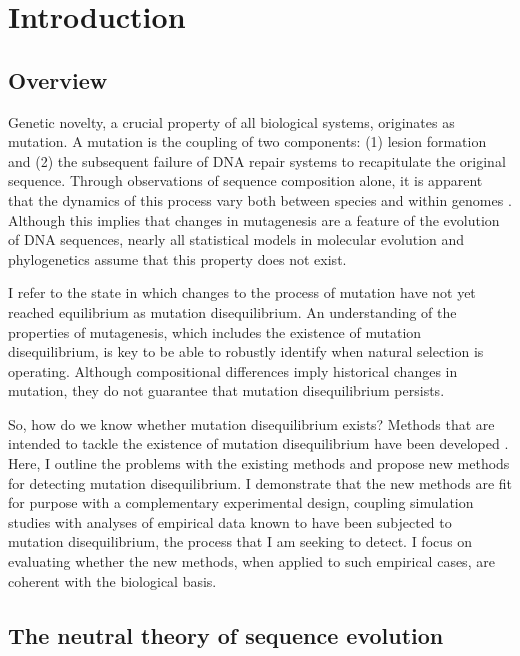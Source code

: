 \chapter{Introduction}

\section{Overview}
Genetic novelty, a crucial property of all biological systems, originates as mutation. A mutation is the coupling of two components: (1) lesion formation and (2) the subsequent failure of DNA repair systems to recapitulate the original sequence. Through observations of sequence composition alone, it is apparent that the dynamics of this process vary both between species \citep{Karlin1994ComparisonsSequences} and within genomes \citep{Francioli2015Genome-wideHumans}. Although this implies that changes in mutagenesis are a feature of the evolution of DNA sequences, nearly all statistical models in molecular evolution and phylogenetics assume that this property does not exist. 

I refer to the state in which changes to the process of mutation have not yet reached \gls{equilibrium} as mutation disequilibrium. An understanding of the properties of mutagenesis, which includes the existence of mutation disequilibrium, is key to be able to robustly identify when natural selection is operating. Although compositional differences imply historical changes in mutation, they do not guarantee that mutation disequilibrium persists. 

So, how do we know whether mutation disequilibrium exists? Methods that are intended to tackle the existence of mutation disequilibrium have been developed \citep{Squartini2008QuantifyingProcess, Singh2009StrongDrosophila, Ababneh2006Matched-pairsSequences}. Here, I outline the problems with the existing methods and propose new methods for detecting mutation disequilibrium. I demonstrate that the new methods are fit for purpose with a complementary experimental design, coupling simulation studies with analyses of empirical data known to have been subjected to mutation disequilibrium, the process that I am seeking to detect. I focus on evaluating whether the new methods, when applied to such empirical cases, are coherent with the biological basis.

\section{The neutral theory of sequence evolution}

